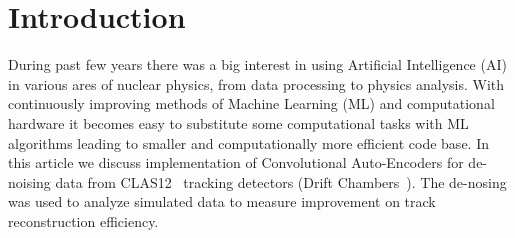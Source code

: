 \section{Introduction}

During past few years there was a big interest in using Artificial Intelligence (AI) in 
various ares of nuclear physics, from data processing to physics analysis. With continuously 
improving methods of Machine Learning (ML) and computational hardware it becomes easy to 
substitute some computational tasks with ML algorithms leading to smaller and computationally
more efficient code base. In this article we discuss implementation of Convolutional Auto-Encoders 
for de-noising data from CLAS12~\cite{Burkert:2020akg} tracking detectors (Drift 
Chambers~\cite{Mestayer:2020saf}). The de-nosing was used to analyze simulated data to measure
improvement on track reconstruction efficiency.
